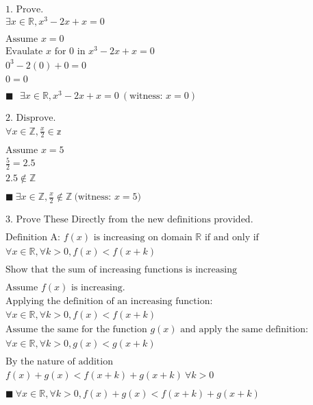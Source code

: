 \documentclass{article}
\begin{document}
\begin{gather*}
\text {1. Prove. } 
\\ 
\exists x\in \mathbb{R}, x^3-2x+x=0
\\
\\
\text{Assume } x=0
\\
\text{Evaulate } x \text{ for } 0 \text{ in } x^3-2x+x=0
\\
0^3-2(0)+0=0
\\ 
0=0
\\ \\

\blacksquare \text{ } \exists x\in \mathbb{R}, x^3-2x+x=0 \ (\text{witness: }x=0)

\\ \\ \\ 

\text{2. Disprove. }
\\
\forall x\in \mathbb{Z}, \frac{x}{2}\in \mathbb{z}
\\ \\
\text{Assume }x=5
\\
\frac{5}{2} = 2.5
\\
2.5\notin \mathbb{Z}
\\ \\
\blacksquare \ \exists x \in \mathbb{Z}, \frac{x}{2} \notin \mathbb{Z} \ \text{(witness: } x=5)
\\ \\ \\ 

\text{3. Prove These Directly from the new definitions provided.}
\\ \\
\text{Definition A: } f(x) \text{ is increasing on domain } \mathbb{R} \text{ if and only if } \\ \forall x \in \mathbb{R}, \forall k > 0, f(x) < f(x+k)
\\ \\ 
\text{Show that the sum of increasing functions is increasing}

\\ \\ \text{Assume } f(x) \text{ is increasing.}
\\ \text{Applying the definition of an increasing function:} \\
\forall x \in \mathbb{R}, \forall k > 0, f(x) < f(x+k)
\\ \text{Assume the same for the function } g(x) \text{ and apply the same definition:} \\
\forall x \in \mathbb{R}, \forall k > 0, g(x) < g(x+k) \\ \\
\text{By the nature of addition} \\
f(x)+g(x) < f(x+k)+g(x+k) \ \forall k > 0
\\ \\
\blacksquare \ \forall x \in \mathbb{R}, \forall k > 0, f(x)+g(x) < f(x+k)+g(x+k)


\end{gather*}
\end{document}
